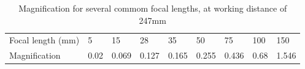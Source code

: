 \begin{table}[!h]
  \centering

  \caption{Magnification for several commom focal lengths, at working distance of 247mm}
  \label{tab:lens_magnification}
  \begin{tabular}{lllllllll}
    \toprule
    Focal length (mm) & 5    & 15    & 28    & 35    & 50    & 75    & 100  & 150   \\
    Magnification     & 0.02 & 0.069 & 0.127 & 0.165 & 0.255 & 0.436 & 0.68 & 1.546 \\
    \bottomrule
  \end{tabular}
\end{table}